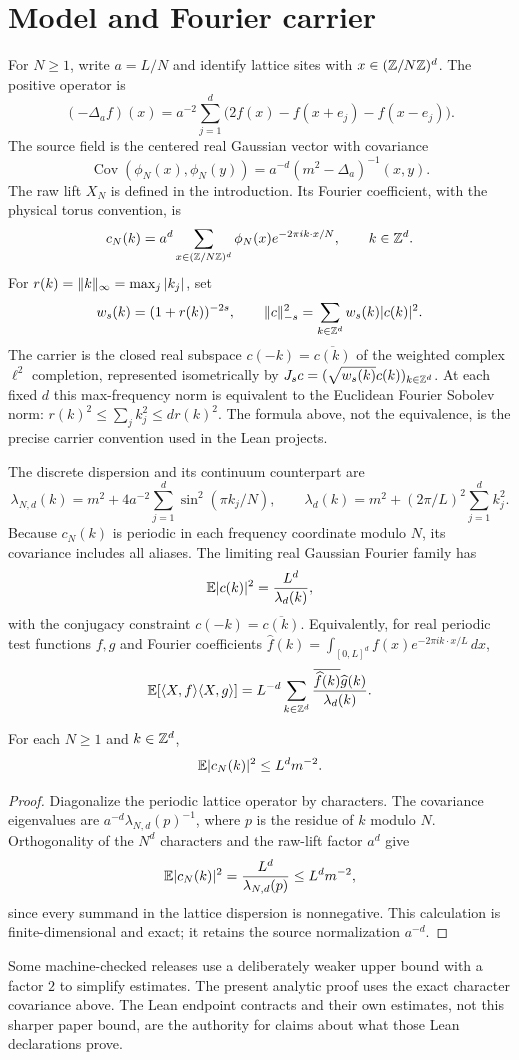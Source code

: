 \section{Model and Fourier carrier}\label{sec:model}
For $N\geq1$, write $a=L/N$ and identify lattice sites with $x\in(\mathbb Z/N\mathbb Z)^d$. The positive operator is
\[
 (-\Delta_a f)(x)=a^{-2}\sum_{j=1}^d\bigl(2f(x)-f(x+e_j)-f(x-e_j)\bigr).
\]
The source field is the centered real Gaussian vector with covariance
\[
 \operatorname{Cov}(\phi_N(x),\phi_N(y))=a^{-d}(m^2-\Delta_a)^{-1}(x,y).
\]
The raw lift $X_N$ is defined in the introduction. Its Fourier coefficient, with the physical torus convention, is
\[
 c_N(k)=a^d\sum_{x\in(\mathbb Z/N\mathbb Z)^d}\phi_N(x)e^{-2\pi i k\cdot x/N},\qquad k\in\mathbb Z^d.
\]
For $r(k)=\lVert k\rVert_\infty=\max_j|k_j|$, set
\[
 w_s(k)=(1+r(k))^{-2s},\qquad \lVert c\rVert_{-s}^2=\sum_{k\in\mathbb Z^d}w_s(k)|c(k)|^2.
\]
The carrier is the closed real subspace $c(-k)=\overline{c(k)}$ of the weighted complex $\ell^2$ completion, represented isometrically by $J_sc=(\sqrt{w_s(k)}c(k))_{k\in\mathbb Z^d}$. At each fixed $d$ this max-frequency norm is equivalent to the Euclidean Fourier Sobolev norm: $r(k)^2\leq\sum_jk_j^2\leq d r(k)^2$. The formula above, not the equivalence, is the precise carrier convention used in the Lean projects.

The discrete dispersion and its continuum counterpart are
\[
 \lambda_{N,d}(k)=m^2+4a^{-2}\sum_{j=1}^d\sin^2(\pi k_j/N),\qquad
 \lambda_d(k)=m^2+(2\pi/L)^2\sum_{j=1}^d k_j^2.
\]
Because $c_N(k)$ is periodic in each frequency coordinate modulo $N$, its covariance includes all aliases. The limiting real Gaussian Fourier family has
\[
 \mathbb E|c(k)|^2=\frac{L^d}{\lambda_d(k)},
\]
with the conjugacy constraint $c(-k)=\overline{c(k)}$. Equivalently, for real periodic test functions $f,g$ and Fourier coefficients $\widehat f(k)=\int_{[0,L]^d}f(x)e^{-2\pi i k\cdot x/L}\,dx$,
\[
 \mathbb E[\langle X,f\rangle\langle X,g\rangle]
 =L^{-d}\sum_{k\in\mathbb Z^d}\frac{\overline{\widehat f(k)}\widehat g(k)}{\lambda_d(k)}.
\]

\begin{lemma}\label{lem:mode}
For each $N\geq1$ and $k\in\mathbb Z^d$,
\[
 \mathbb E|c_N(k)|^2\leq L^d m^{-2}.
\]
\end{lemma}
\begin{proof}
Diagonalize the periodic lattice operator by characters. The covariance eigenvalues are $a^{-d}\lambda_{N,d}(p)^{-1}$, where $p$ is the residue of $k$ modulo $N$. Orthogonality of the $N^d$ characters and the raw-lift factor $a^d$ give
\[
 \mathbb E|c_N(k)|^2=\frac{L^d}{\lambda_{N,d}(p)}\leq L^d m^{-2},
\]
since every summand in the lattice dispersion is nonnegative. This calculation is finite-dimensional and exact; it retains the source normalization $a^{-d}$.
\end{proof}

\begin{remark}
Some machine-checked releases use a deliberately weaker upper bound with a factor $2$ to simplify estimates. The present analytic proof uses the exact character covariance above. The Lean endpoint contracts and their own estimates, not this sharper paper bound, are the authority for claims about what those Lean declarations prove.
\end{remark}
